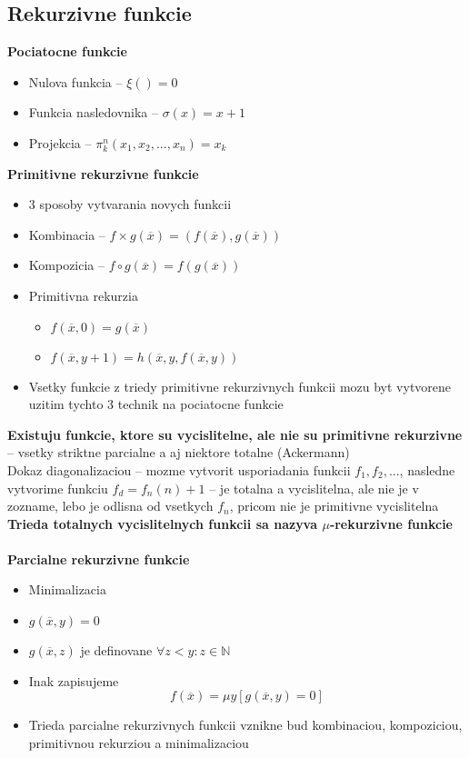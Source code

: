 \documentclass[12pt]{article}
\begin{document}
\subsection*{Rekurzivne funkcie}
\textbf{Pociatocne funkcie}
\begin{itemize}
	\item Nulova funkcia -- $\xi() = 0$
	\item Funkcia nasledovnika -- $\sigma(x) = x + 1$
	\item Projekcia -- $\pi_{k}^{n}(x_{1},x_{2},...,x_{n}) = x_{k}$
\end{itemize}
\textbf{Primitivne rekurzivne funkcie}
\begin{itemize}
	\item 3 sposoby vytvarania novych funkcii
	\item Kombinacia -- $f \times g(\overline{x}) = (f(\overline{x}),g(\overline{x}))$
	\item Kompozicia -- $f \circ g(\overline{x}) = f(g(\overline{x}))$
	\item Primitivna rekurzia
		\begin{itemize}
			\item $f(\overline{x},0) = g(\overline{x})$
			\item $f(\overline{x},y+1) = h(\overline{x},y,f(\overline{x},y))$
		\end{itemize}
	\item Vsetky funkcie z triedy primitivne rekurzivnych funkcii mozu byt vytvorene uzitim tychto 3 technik na pociatocne funkcie
\end{itemize}
\textbf{Existuju funkcie, ktore su vycislitelne, ale nie su primitivne rekurzivne} -- vsetky striktne parcialne a aj niektore totalne (Ackermann)\\
Dokaz diagonalizaciou -- mozme vytvorit usporiadania funkcii $f_{1},f_{2},...$, nasledne vytvorime funkciu $f_{d} = f_{n}(n) + 1$ -- je totalna a vycislitelna, ale nie je
v zozname, lebo je odlisna od vsetkych $f_{n}$, pricom nie je primitivne vycislitelna\\
\textbf{Trieda totalnych vycislitelnych funkcii sa nazyva $\mu$-rekurzivne funkcie}\\
\\
\textbf{Parcialne rekurzivne funkcie}
\begin{itemize}
	\item Minimalizacia
	\item $g(\overline{x},y) = 0$
	\item $g(\overline{x},z)$ je definovane $\forall z < y: z \in \mathbb{N}$
	\item Inak zapisujeme
		\begin{equation*}
			f(\overline{x}) = \mu y[g(\overline{x},y) = 0]
		\end{equation*}
	\item Trieda parcialne rekurzivnych funkcii vznikne bud kombinaciou, kompoziciou, primitivnou rekurziou a minimalizaciou
\end{itemize}
\end{document}
